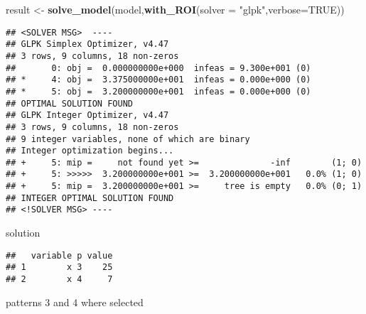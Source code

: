 \documentclass[
]{article}
\newenvironment{Shaded}{\begin{snugshade}}{\end{snugshade}}
\newcommand{\DataTypeTok}[1]{\textcolor[rgb]{0.13,0.29,0.53}{#1}}
\newcommand{\DecValTok}[1]{\textcolor[rgb]{0.00,0.00,0.81}{#1}}
\newcommand{\KeywordTok}[1]{\textcolor[rgb]{0.13,0.29,0.53}{\textbf{#1}}}
\newcommand{\NormalTok}[1]{#1}
\newcommand{\OperatorTok}[1]{\textcolor[rgb]{0.81,0.36,0.00}{\textbf{#1}}}
\newcommand{\OtherTok}[1]{\textcolor[rgb]{0.56,0.35,0.01}{#1}}
\newcommand{\StringTok}[1]{\textcolor[rgb]{0.31,0.60,0.02}{#1}}
\begin{document}
\begin{Shaded}
\begin{Highlighting}[]
\NormalTok{result <-}\StringTok{ }\KeywordTok{solve_model}\NormalTok{(model,}\KeywordTok{with_ROI}\NormalTok{(}\DataTypeTok{solver =} \StringTok{"glpk"}\NormalTok{,}\DataTypeTok{verbose=}\OtherTok{TRUE}\NormalTok{))}
\end{Highlighting}
\end{Shaded}

\begin{verbatim}
## <SOLVER MSG>  ----
## GLPK Simplex Optimizer, v4.47
## 3 rows, 9 columns, 18 non-zeros
##       0: obj =  0.000000000e+000  infeas = 9.300e+001 (0)
## *     4: obj =  3.375000000e+001  infeas = 0.000e+000 (0)
## *     5: obj =  3.200000000e+001  infeas = 0.000e+000 (0)
## OPTIMAL SOLUTION FOUND
## GLPK Integer Optimizer, v4.47
## 3 rows, 9 columns, 18 non-zeros
## 9 integer variables, none of which are binary
## Integer optimization begins...
## +     5: mip =     not found yet >=              -inf        (1; 0)
## +     5: >>>>>  3.200000000e+001 >=  3.200000000e+001   0.0% (1; 0)
## +     5: mip =  3.200000000e+001 >=     tree is empty   0.0% (0; 1)
## INTEGER OPTIMAL SOLUTION FOUND
## <!SOLVER MSG> ----
\end{verbatim}

\begin{Shaded}
\end{Shaded}

\begin{Shaded}
\begin{Highlighting}[]
\NormalTok{solution}
\end{Highlighting}
\end{Shaded}

\begin{verbatim}
##   variable p value
## 1        x 3    25
## 2        x 4     7
\end{verbatim}

patterns 3 and 4 where selected

\begin{Shaded}
\end{Shaded}
\end{document}
